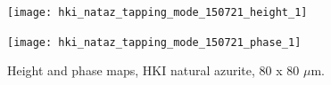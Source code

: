 \begin{figure}[H]
\centering
\begin{minipage}{.45\textwidth}
  \centering
  \texttt{[image: hki\_nataz\_tapping\_mode\_150721\_height\_1]}
\end{minipage}
\begin{minipage}{.45\textwidth}
  \centering
  \texttt{[image: hki\_nataz\_tapping\_mode\_150721\_phase\_1]}
\end{minipage}
\caption[Height and phase maps, HKI natural azurite]{Height and phase maps, HKI natural azurite, 80 x 80 $\mu$m.}
\label{fig:afm_hki_nataz_height_phase_1}
\end{figure}




